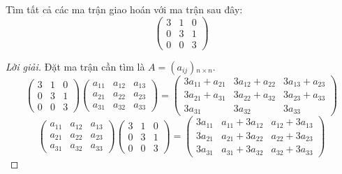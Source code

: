 \documentclass[class=nhvh-linear-algebra,crop=false]{standalone}
\begin{document}
\begin{exercise}
    Tìm tất cả các ma trận giao hoán với ma trận sau đây:
    \[
        \begin{pmatrix}
            3 & 1 & 0 \\
            0 & 3 & 1 \\
            0 & 0 & 3
        \end{pmatrix}
    \]
\end{exercise}

\begin{proof}[Lời giải]
    Đặt ma trận cần tìm là $A = (a_{ij}){}_{n\times n}$.
    \[
        \begin{pmatrix}
            3 & 1 & 0 \\
            0 & 3 & 1 \\
            0 & 0 & 3
        \end{pmatrix}
        \begin{pmatrix}
            a_{11} & a_{12} & a_{13} \\
            a_{21} & a_{22} & a_{23} \\
            a_{31} & a_{32} & a_{33}
        \end{pmatrix}=
        \begin{pmatrix}
            3a_{11} + a_{21} & 3a_{12} + a_{22} & 3a_{13} + a_{23} \\
            3a_{21} + a_{31} & 3a_{22} + a_{32} & 3a_{23} + a_{33} \\
            3a_{31}          & 3a_{32}          & 3a_{33}
        \end{pmatrix}
    \]
    \[
        \begin{pmatrix}
            a_{11} & a_{12} & a_{13} \\
            a_{21} & a_{22} & a_{23} \\
            a_{31} & a_{32} & a_{33}
        \end{pmatrix}
        \begin{pmatrix}
            3 & 1 & 0 \\
            0 & 3 & 1 \\
            0 & 0 & 3
        \end{pmatrix}=
        \begin{pmatrix}
            3a_{11} & a_{11} + 3a_{12} & a_{12} + 3a_{13} \\
            3a_{21} & a_{21} + 3a_{22} & a_{22} + 3a_{23} \\
            3a_{31} & a_{31} + 3a_{32} & a_{32} + 3a_{33}
        \end{pmatrix}
\]
\end{proof}
\end{document}
